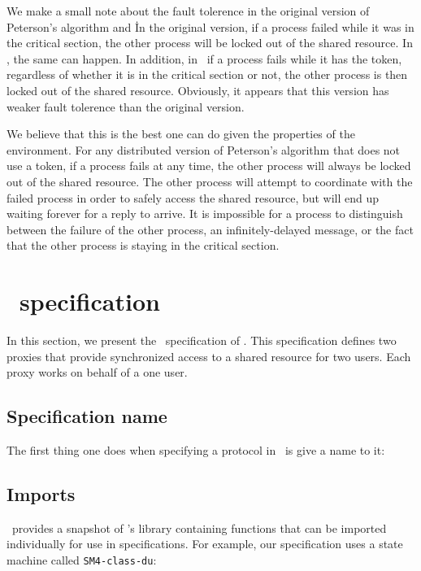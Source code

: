 \documentclass[final]{article}
\begin{document}
We make a small note about the fault tolerence in the original version
of Peterson's algorithm and \mpp\.
%
In the original version, if a process failed while it was in the
critical section, the other process will be locked out of the shared
resource.
%
In \mpp, the same can happen.
%
In addition, in \mpp\ if a process fails while it has the token,
regardless of whether it is in the critical section or not, the other
process is then locked out of the shared resource.
%
Obviously, it appears that this version has weaker fault tolerence
than the original version.
%

We believe that this is the best one can do given the properties of
the environment.
%
For any distributed version of Peterson's algorithm that does not use
a token, if a process fails at any time, the other process will always
be locked out of the shared resource.
%
The other process will attempt to coordinate with the failed process
in order to safely access the shared resource, but will end up waiting
forever for a reply to arrive.
%
It is impossible for a process to distinguish between the failure of
the other process, an infinitely-delayed message, or the fact that the
other process is staying in the critical section.
%

\section{\eml\ specification}
\label{sec:eventml}

In this section, we present the \eml\ specification of \mpp.
%
This specification defines two proxies that provide synchronized
access to a shared resource for two users.  Each proxy works on behalf
of a one user.


\subsection{Specification name}

The first thing one does when specifying a protocol in \eml\ is give a
name to it:
\begin{emlcode}
  
\end{emlcode}


\subsection{Imports}

\eml\ provides a snapshot of \nuprl's library containing functions
that can be imported individually for use in specifications.  For
example, our specification uses a state machine called
\lstinline{SM4-class-du}:
\begin{emlcode}
  
\end{emlcode}
\end{document}
